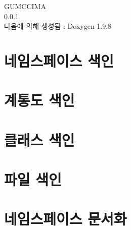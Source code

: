 \documentclass[twoside]{book}
\newcommand{\+}{\discretionary{\mbox{\scriptsize$\hookleftarrow$}}{}{}}
\newcommand{\clearemptydoublepage}{%
    \newpage{\pagestyle{empty}\cleardoublepage}%
  }
\begin{document}
  \raggedbottom
    \hypersetup{pageanchor=false,
                bookmarksnumbered=true,
                pdfencoding=unicode
               }
  \begin{titlepage}
  \vspace*{7cm}
  \begin{center}%
  {\Large GUMCCIMA}\\
  [1ex]\large 0.\+0.\+1 \\
  \vspace*{1cm}
  {\large 다음에 의해 생성됨 \+:  Doxygen 1.9.8}\\
  \end{center}
  \end{titlepage}
  \clearemptydoublepage
  \tableofcontents
  \clearemptydoublepage
  \hypersetup{pageanchor=true}
\chapter{네임스페이스 색인}

\chapter{계통도 색인}

\chapter{클래스 색인}

\chapter{파일 색인}

\chapter{네임스페이스 문서화}






\end{document}

